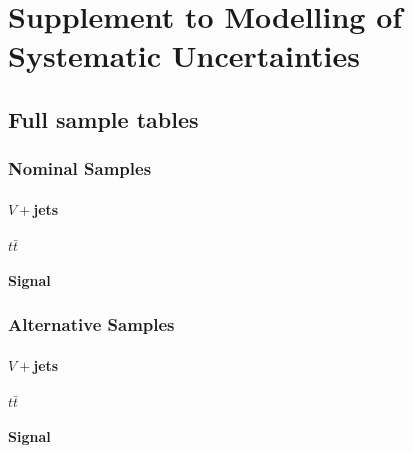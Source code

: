 \chapter{Supplement to Modelling of Systematic Uncertainties}
\label{app:syst-summary}

\section{Full sample tables}
\label{app:full-nominal-samples}
\subsection{Nominal Samples}
\subsubsection{$V+$jets}



\subsubsection{\texorpdfstring{$t\bar{t}$}{tt}}

\subsubsection{Signal}


\subsection{Alternative Samples}
\subsubsection{$V+$jets}


\subsubsection{\texorpdfstring{$t\bar{t}$}{tt}}

\subsubsection{Signal}


